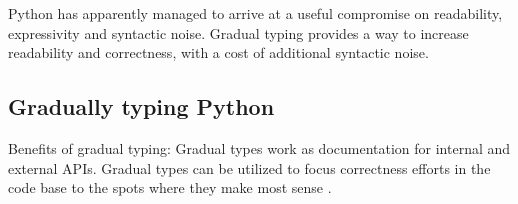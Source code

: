 Python has apparently managed to arrive at a useful compromise on readability, expressivity and syntactic noise. Gradual typing provides a way to increase readability and correctness, with a cost of additional syntactic noise.

\subsection{Gradually typing Python}
Benefits of gradual typing: Gradual types work as documentation for internal and external APIs. Gradual types can be utilized to focus correctness efforts in the code base to the spots where they make most sense \cite{di_grazia_evolution_2022}.


